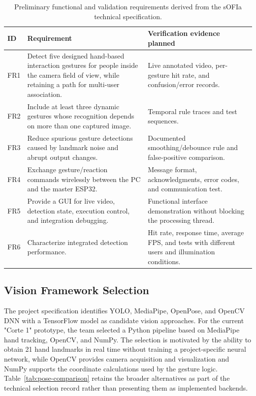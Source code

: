 \documentclass[lettersize,journal]{IEEEtran}
\begin{document}
\begin{table}[H]
\centering
\caption{Preliminary functional and validation requirements derived from the sOFIa technical specification.}
\label{tab:requirements}
\scriptsize
\setlength{\tabcolsep}{2.5pt}
\begin{tabularx}{\columnwidth}{p{0.55cm}p{3.55cm}X}
\hline
\textbf{ID} & \textbf{Requirement} & \textbf{Verification evidence planned} \\
\hline
FR1 & Detect five designed hand-based interaction gestures for people inside the camera field of view, while retaining a path for multi-user association. & Live annotated video, per-gesture hit rate, and confusion/error records. \\
FR2 & Include at least three dynamic gestures whose recognition depends on more than one captured image. & Temporal rule traces and test sequences. \\
FR3 & Reduce spurious gesture detections caused by landmark noise and abrupt output changes. & Documented smoothing/debounce rule and false-positive comparison. \\
FR4 & Exchange gesture/reaction commands wirelessly between the PC and the master ESP32. & Message format, acknowledgments, error codes, and communication test. \\
FR5 & Provide a GUI for live video, detection state, execution control, and integration debugging. & Functional interface demonstration without blocking the processing thread. \\
FR6 & Characterize integrated detection performance. & Hit rate, response time, average FPS, and tests with different users and illumination conditions. \\
\hline
\end{tabularx}
\end{table}

\subsection{Vision Framework Selection}
\label{sec:pose-selection}

The project specification identifies YOLO, MediaPipe, OpenPose, and OpenCV DNN with a TensorFlow model as candidate vision approaches. For the current "Corte 1" prototype, the team selected a Python pipeline based on MediaPipe hand tracking, OpenCV, and NumPy. The selection is motivated by the ability to obtain 21 hand landmarks in real time without training a project-specific neural network, while OpenCV provides camera acquisition and visualization and NumPy supports the coordinate calculations used by the gesture logic. Table~\ref{tab:pose-comparison} retains the broader alternatives as part of the technical selection record rather than presenting them as implemented backends.
\end{document}
